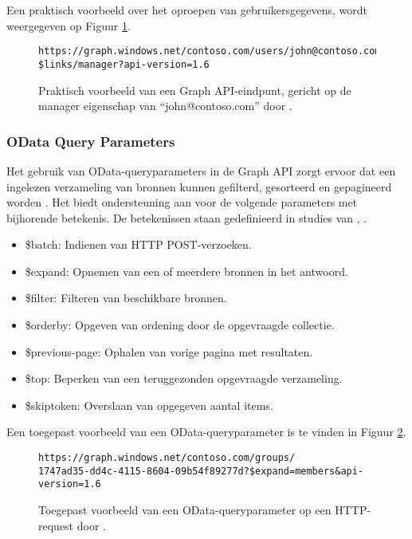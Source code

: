 Een praktisch voorbeeld over het oproepen van gebruikersgegevens, wordt weergegeven op Figuur \ref{pfe}. \\

\begin{figure}[h]
    \scriptsize\begin{verbatim}https://graph.windows.net/contoso.com/users/john@contoso.com/
$links/manager?api-version=1.6
    \end{verbatim}    
    \caption[Voorbeeld Graph API-eindpunt]{Praktisch voorbeeld van een Graph \ac{API}-eindpunt, gericht op de manager eigenschap van “john@contoso.com” door \textcite{Microsoft2015}.}
    \label{pfe}
\end{figure}



\subsubsection{OData Query Parameters}


Het gebruik van OData-queryparameters in de Graph \ac{API} zorgt ervoor dat een ingelezen verzameling van bronnen kunnen gefilterd, gesorteerd en gepagineerd worden \autocite{Microsoft2015}. Het biedt ondersteuning aan voor de volgende parameters met bijhorende betekenis. De betekenissen staan gedefinieerd in studies van \textcite{Liang2016}, \textcite{Wojcieszyn2014}. 

\begin{itemize}
    \item \$batch: Indienen van \ac{HTTP} POST-verzoeken.
    \item \$expand: Opnemen van een of meerdere bronnen in het antwoord.
    \item \$filter: Filteren van beschikbare bronnen.
    \item \$orderby: Opgeven van ordening door de opgevraagde collectie.
    \item \$previous-page: Ophalen van vorige pagina met resultaten.
    \item \$top: Beperken van een teruggezonden opgevraagde verzameling.
    \item \$skiptoken: Overslaan van opgegeven aantal items.
\end{itemize}

Een toegepast voorbeeld van een OData-queryparameter is te vinden in Figuur \ref{odqp}. \\

\begin{figure}[h]
\scriptsize\begin{verbatim}
https://graph.windows.net/contoso.com/groups/
1747ad35-dd4c-4115-8604-09b54f89277d?$expand=members&api-version=1.6
\end{verbatim}    
\caption[Voorbeeld OData-queryparamter]{Toegepast voorbeeld van een OData-queryparameter op een \ac{HTTP}-request door \textcite{Microsoft2016b}.}
\label{odqp}
\end{figure}



